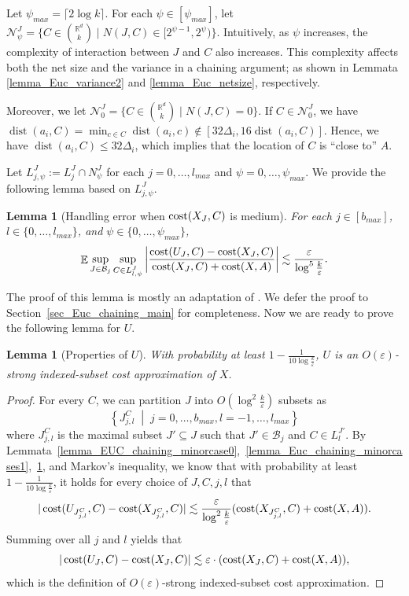 \documentclass[11pt,letterpaper]{article}
\newtheorem{lemma}[theorem]{Lemma}
\theoremstyle{definition}
\newcommand{\eps}{\varepsilon}
\DeclareMathOperator*{\E}{\ensuremath{\mathbb{E}}}
\DeclareMathOperator{\dist}{dist}
\begin{document}
Let $\psi_{max}=\lceil2\log k\rceil$. For each $\psi \in [\psi_{max}]$, let $\mathcal{N}^J_\psi=\{C\in \binom{\mathbb{R}^d}{k}\mid N(J,C)\in [2^{\psi-1},2^\psi)\}$. 
%
Intuitively, as $\psi$ increases, the complexity of interaction between $J$ and $C$ also increases.
%
This complexity affects both the net size and the variance in a chaining argument; as shown in Lemmata \ref{lemma_Euc_variance2} and \ref{lemma_Euc_netsize}, respectively.
%

Moreover, we let $\mathcal{N}^J_0=\{C\in \binom{\mathbb{R}^d}{k}\mid N(J,C)=0\}$. 
%
If $C\in \mathcal{N}^J_0$, we have $\dist(a_i, C) = \min_{c\in C} \dist(a_i, c) \notin [32\Delta_i,16\dist(a_i,C)]$.
%
Hence, we have $\dist(a_i, C)\leq 32\Delta_i$, which implies that the location of $C$ is ``close to'' $A$.

Let $L_{j,\psi}^J := L_j^J\cap N_\psi^J$ for each $j=0,\dots,l_{max}$ and $\psi=0,\dots,\psi_{max}$.
%
We provide the following lemma based on $L_{j,\psi}^J$.

\begin{lemma}[Handling error when $\cost(X_J, C)$ is medium] 
\label{lemma_Euc_chaining_main}
For each $j\in [b_{max}]$, $l\in \{0,\dots,l_{max}\}$, and $\psi \in \{0,\dots,\psi_{max}\}$,
\begin{eqnarray} \label{inq_Euc_main}
\E\sup_{J\in \mathcal{B}_j}\sup_{C\in L^J_{l,\psi}} \bigg|\frac{\cost(U_J,C)-\cost(X_J,C)}{\cost(X_J,C)+\cost(X,A)}\bigg|\lesssim \frac{\eps}{\log^5\frac{k}{\eps}}.
\end{eqnarray}
\end{lemma}

The proof of this lemma is mostly an adaptation of \cite{bansal2024sensitivity}.
%
We defer the proof to Section~\ref{sec_Euc_chaining_main} for completeness. 
%
Now we are ready to prove the following lemma for $U$.

\begin{lemma}[Properties of $U$] 
\label{lemma_Euc_U_subset}
With probability at least $1-\frac{1}{10\log \frac{k}{\eps}}$, $U$ is an $O(\eps)$-strong indexed-subset cost approximation of $X$.
\end{lemma}
\begin{proof} For every $C$, we can partition $J$ into $O(\log^2\frac{k}{\eps})$ subsets as 
\[
    \left\{ J_{j,l}^C \;\middle\vert\; j=0,\dots,b_{max},l=-1,\dots,l_{max} \right\}
\]
where $J_{j,l}^C$ is the maximal subset $J'\subseteq J$ such that $J'\in \mathcal{B}_j$ and $C\in L_l^{J'}$. 
%
By Lemmata~\ref{lemma_EUC_chaining_minorcase0},~\ref{lemma_Euc_chaining_minorcases1},~\ref{lemma_Euc_chaining_main}, and Markov's inequality, we know that with probability at least $1-\frac{1}{10\log \frac{k}{\eps}}$, it holds for every choice of $J,C,j,l$ that
\[
|\cost(U_{J_{j,l}^C},C)-\cost(X_{J_{j,l}^C},C)|\lesssim \frac{\eps}{\log^2\frac{k}{\eps}} (\cost(X_{J_{j,l}^C},C)+\cost(X,A)).
\]
Summing over all $j$ and $l$ yields that
$$
|\cost(U_J,C)-\cost(X_J,C)|\lesssim \eps \cdot (\cost(X_J,C)+\cost(X,A)),
$$
which is the definition of $O(\eps)$-strong indexed-subset cost approximation.
\end{proof}
\end{document}
